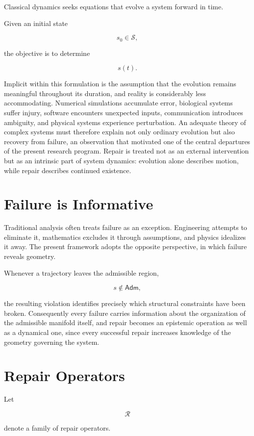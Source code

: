 \documentclass[11pt,oneside]{book}
\numberwithin{equation}{chapter}
\theoremstyle{definition}
\theoremstyle{plain}
\newcommand{\State}{\mathcal{S}}
\newcommand{\Adm}{\mathsf{Adm}}
\newcommand{\Repair}{\mathcal{R}}
\begin{document}
Classical dynamics seeks equations that evolve a system forward in time.

Given an initial state

\[
s_0 \in \State,
\]

the objective is to determine

\[
s(t).
\]

Implicit within this formulation is the assumption that the evolution remains meaningful throughout its duration, and reality is considerably less accommodating. Numerical simulations accumulate error, biological systems suffer injury, software encounters unexpected inputs, communication introduces ambiguity, and physical systems experience perturbation. An adequate theory of complex systems must therefore explain not only ordinary evolution but also recovery from failure, an observation that motivated one of the central departures of the present research program. Repair is treated not as an external intervention but as an intrinsic part of system dynamics: evolution alone describes motion, while repair describes continued existence.

\section{Failure is Informative}

Traditional analysis often treats failure as an exception. Engineering attempts to eliminate it, mathematics excludes it through assumptions, and physics idealizes it away. The present framework adopts the opposite perspective, in which failure reveals geometry.

Whenever a trajectory leaves the admissible region,

\[
s \notin \Adm,
\]

the resulting violation identifies precisely which structural constraints have been broken. Consequently every failure carries information about the organization of the admissible manifold itself, and repair becomes an epistemic operation as well as a dynamical one, since every successful repair increases knowledge of the geometry governing the system.

\section{Repair Operators}

Let

\[
\Repair
\]

denote a family of repair operators.
\end{document}
